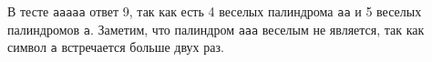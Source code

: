В тесте \texttt{aaaaa} ответ 9, так как есть 4 веселых палиндрома \texttt{aa} и 5 веселых палиндромов \texttt{a}. Заметим, что палиндром \texttt{aaa} веселым не является, так как символ \texttt{a} встречается больше двух раз.